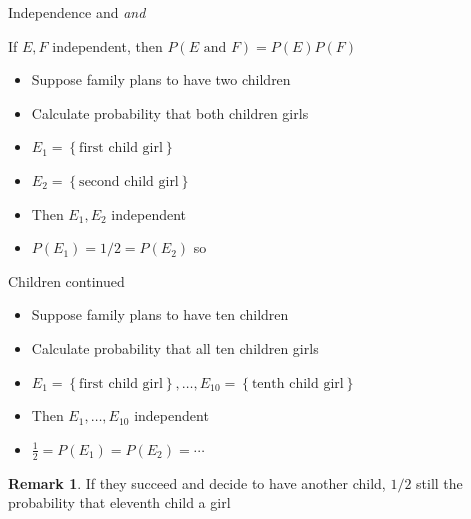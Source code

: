 \documentclass{beamer}
\theoremstyle{definition}
\newtheorem{remark}{Remark}
\begin{document}
\begin{frame}{Independence and \em{and}}
\begin{theorem}
If $E,F$ independent, then
$P\left(\text{$E$ and $F$}\right)=P\left(E\right)P\left(F\right)$
\end{theorem}
\begin{example}
\begin{itemize}
\item Suppose family plans to have two children
\item Calculate probability that both children girls
\item $E_1=\left\{\text{first child girl}\right\}$
\item $E_2=\left\{\text{second child girl}\right\}$
\item Then $E_1,E_2$ independent
\item $P\left(E_1\right)=1/2=P\left(E_2\right)$ so
\end{itemize}
\end{example}
\end{frame}

\begin{frame}{Children continued}
\begin{itemize}
\item Suppose family plans to have \alert{ten} children
\item Calculate probability that all ten children girls
\item $E_1=\left\{\text{first child girl}\right\},\ldots,
E_{10}=\left\{\text{tenth child girl}\right\}$
\item Then $E_1,\ldots,E_{10}$ independent
\item $\frac{1}{2}=P\left(E_1\right)=P\left(E_2\right)=\cdots$
\end{itemize}
\begin{remark}
If they succeed and decide to have another child,
$1/2$ still the probability that eleventh child a girl
\end{remark}
\end{frame}
\end{document}
